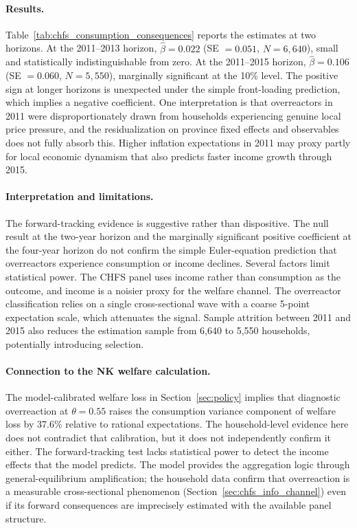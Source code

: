 \paragraph{Results.}
Table~\ref{tab:chfs_consumption_consequences} reports the estimates
at two horizons. At the 2011--2013 horizon, $\hat{\beta} = 0.022$
(SE $= 0.051$, $N = 6{,}640$), small and statistically
indistinguishable from zero. At the 2011--2015 horizon,
$\hat{\beta} = 0.106$ (SE $= 0.060$, $N = 5{,}550$), marginally
significant at the 10\% level. The positive sign at longer horizons
is unexpected under the simple front-loading prediction, which implies
a negative coefficient. One interpretation is that overreactors
in 2011 were disproportionately drawn from households experiencing
genuine local price pressure, and the residualization on province
fixed effects and observables does not fully absorb this. Higher
inflation expectations in 2011 may proxy partly for local economic
dynamism that also predicts faster income growth through 2015.



\paragraph{Interpretation and limitations.}
The forward-tracking evidence is suggestive rather than dispositive.
The null result at the two-year horizon and the marginally significant
positive coefficient at the four-year horizon do not confirm the
simple Euler-equation prediction that overreactors experience
consumption or income declines. Several factors limit statistical
power. The CHFS panel uses income rather than consumption as
the outcome, and income is a noisier proxy for the welfare channel.
The overreactor classification relies on a single
cross-sectional wave with a coarse 5-point expectation scale, which
attenuates the signal. Sample attrition between 2011 and 2015
also reduces the estimation sample from 6,640 to 5,550 households,
potentially introducing selection.

\paragraph{Connection to the NK welfare calculation.}
The model-calibrated welfare loss in Section~\ref{sec:policy} implies
that diagnostic overreaction at $\theta = 0.55$ raises the consumption
variance component of welfare loss by 37.6\% relative to rational
expectations. The household-level evidence here does not contradict
that calibration, but it does not independently confirm it either.
The forward-tracking test lacks statistical power to detect the
income effects that the model predicts. The model provides the
aggregation logic through general-equilibrium amplification; the
household data confirm that overreaction is a measurable
cross-sectional phenomenon (Section~\ref{sec:chfs_info_channel})
even if its forward consequences are imprecisely estimated with the
available panel structure.




